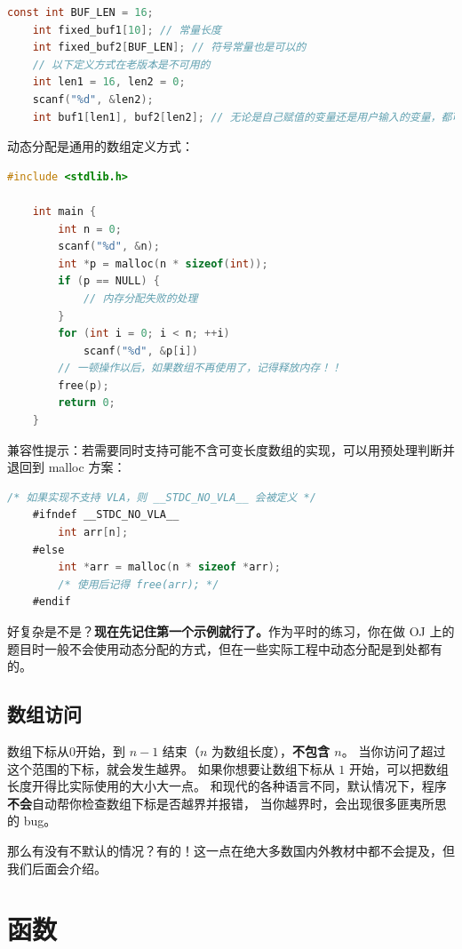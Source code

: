\documentclass[lang=cn,newtx,10pt,scheme=chinese]{elegantbook}
\begin{document}
\begin{lstlisting}[language=C]
    const int BUF_LEN = 16;
    int fixed_buf1[10]; // 常量长度
    int fixed_buf2[BUF_LEN]; // 符号常量也是可以的
    // 以下定义方式在老版本是不可用的
    int len1 = 16, len2 = 0;
    scanf("%d", &len2);
    int buf1[len1], buf2[len2]; // 无论是自己赋值的变量还是用户输入的变量，都可以
\end{lstlisting}

动态分配是通用的数组定义方式：

\begin{lstlisting}[language=C]
    #include <stdlib.h>

    int main {
        int n = 0;
        scanf("%d", &n);
        int *p = malloc(n * sizeof(int));
        if (p == NULL) {
            // 内存分配失败的处理
        }
        for (int i = 0; i < n; ++i)
            scanf("%d", &p[i])
        // 一顿操作以后，如果数组不再使用了，记得释放内存！！
        free(p);
        return 0;
    }
\end{lstlisting}

兼容性提示：若需要同时支持可能不含可变长度数组的实现，可以用预处理判断并退回到 malloc 方案：
\begin{lstlisting}[language=C]
    /* 如果实现不支持 VLA，则 __STDC_NO_VLA__ 会被定义 */
    #ifndef __STDC_NO_VLA__
        int arr[n];
    #else
        int *arr = malloc(n * sizeof *arr);
        /* 使用后记得 free(arr); */
    #endif
\end{lstlisting}

好复杂是不是？\textbf{现在先记住第一个示例就行了。}作为平时的练习，你在做 OJ 上的题目时一般不会使用动态分配的方式，但在一些实际工程中动态分配是到处都有的。

\subsection{数组访问}

数组下标从0开始，到 $n-1$ 结束（$n$ 为数组长度），\textbf{不包含 $n$}。
当你访问了超过这个范围的下标，就会发生越界。
如果你想要让数组下标从 $1$ 开始，可以把数组长度开得比实际使用的大小大一点。
和现代的各种语言不同，默认情况下，程序\textbf{不会}自动帮你检查数组下标是否越界并报错，
当你越界时，会出现很多匪夷所思的 bug。

那么有没有不默认的情况？有的！这一点在绝大多数国内外教材中都不会提及，但我们后面会介绍。

\section{函数}
\end{document}

